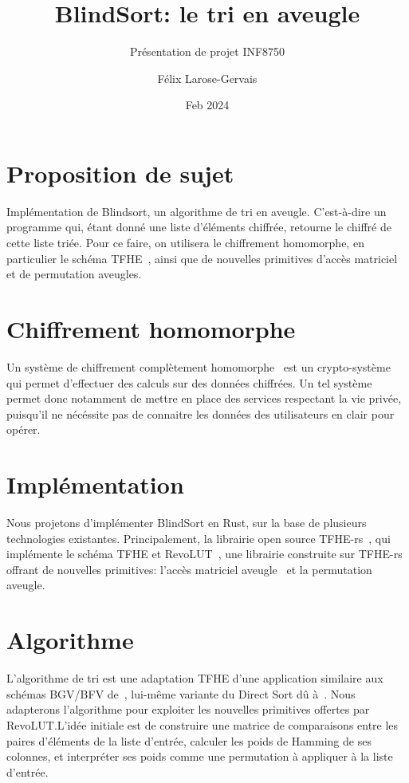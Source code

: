 \documentclass{paper}
\title{BlindSort: le tri en aveugle}
\subtitle{Présentation de projet INF8750}
\author{Félix Larose-Gervais}
\date{Feb 2024}
\begin{document}
\maketitle

\section{Proposition de sujet}

Implémentation de Blindsort, un algorithme de tri en aveugle. C'est-à-dire un programme qui, étant donné une liste d'éléments chiffrée, retourne le chiffré de cette liste triée. Pour ce faire, on utilisera le chiffrement homomorphe, en particulier le schéma TFHE~\cite{chillotti_tfhe_2020}, ainsi que de nouvelles primitives d'accès matriciel et de permutation aveugles.

\section{Chiffrement homomorphe}

Un système de chiffrement complètement homomorphe~\cite{marcolla_survey_2022} est un crypto-système qui permet d'effectuer des calculs sur des données chiffrées. Un tel système permet donc notamment de mettre en place des services respectant la vie privée, puisqu'il ne nécéssite pas de connaitre les données des utilisateurs en clair pour opérer.

\section{Implémentation}

Nous projetons d'implémenter BlindSort en Rust, sur la base de plusieurs technologies existantes. Principalement, la librairie open source TFHE-rs~\cite{TFHE-rs}, qui implémente le schéma TFHE et RevoLUT~\cite{RevoLUT}, une librairie construite sur TFHE-rs offrant de nouvelles primitives: l'accès matriciel aveugle~\cite{azogagh_oblivious_2023} et la permutation aveugle.

\section{Algorithme}

L'algorithme de tri est une adaptation TFHE d'une application similaire aux schémas BGV/BFV de~\cite{iliashenko_faster_2021}, lui-même variante du Direct Sort dû à~\cite{lauter_depth_2015}. Nous adapterons l'algorithme pour exploiter les nouvelles primitives offertes par RevoLUT.\@ L'idée initiale est de construire une matrice de comparaisons entre les paires d'éléments de la liste d'entrée, calculer les poids de Hamming de ses colonnes, et interpréter ses poids comme une permutation à appliquer à la liste d'entrée.

\newpage
\pagestyle{plain}



\end{document}
